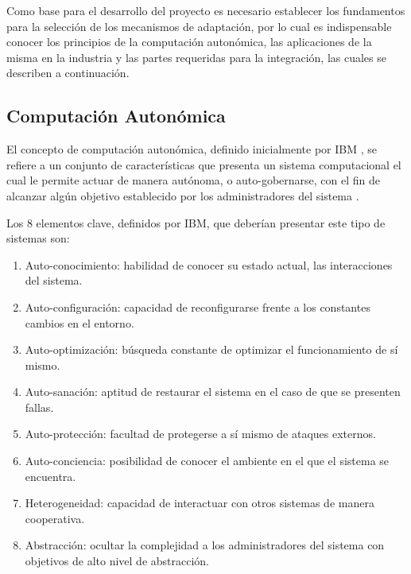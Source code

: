 \documentclass[12pt]{article}
\begin{document}
    Como base para el desarrollo del proyecto es necesario establecer los fundamentos para la selección de los mecanismos de adaptación, por lo cual es indispensable conocer los principios de la computación autonómica, las aplicaciones de la misma en la industria y las partes requeridas para la integración, las cuales se describen a continuación.

    \subsection{Computación Autonómica}
    

    El concepto de computación autonómica, definido inicialmente por IBM \citeyear{horn_2001}, se refiere a un conjunto de características que presenta un sistema computacional el cual le permite actuar de manera autónoma, o auto-gobernarse, con el fin de alcanzar algún objetivo establecido por los administradores del sistema \cite{lalanda_diaconescu_mccann_2014}.


    Los 8 elementos clave, definidos por IBM, que deberían presentar este tipo de sistemas son:
    \begin{enumerate}
        \item Auto-conocimiento: habilidad de conocer su estado actual, las interacciones del sistema.
        \item Auto-configuración: capacidad de reconfigurarse frente a los constantes cambios en el entorno.
        \item Auto-optimización: búsqueda constante de optimizar el funcionamiento de sí mismo.
        \item Auto-sanación: aptitud de restaurar el sistema en el caso de que se presenten fallas.
        \item Auto-protección: facultad de protegerse a sí mismo de ataques externos.
        \item Auto-conciencia: posibilidad de conocer el ambiente en el que el sistema se encuentra.
        \item Heterogeneidad: capacidad de interactuar con otros sistemas de manera cooperativa.
        \item Abstracción: ocultar la complejidad a los administradores del sistema con objetivos de alto nivel de abstracción.
    \end{enumerate}
\end{document}
